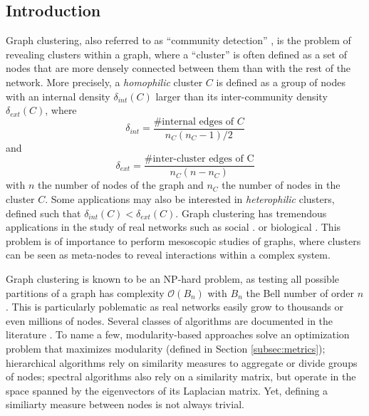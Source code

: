 \documentclass[switch, 12pt]{article}
\renewcommand{\O}{\mathcal{O}}
\begin{document}
\begin{multicols}{2}

    \section{Introduction}

    Graph clustering, also referred to as ``community detection'' \cite{fortunato_community_2010}, is the problem of revealing clusters within a graph, where a ``cluster'' is often defined as a set of nodes that are more densely connected between them than with the rest of the network.
    More precisely, a \emph{homophilic} cluster $C$ is defined as a group of nodes with an internal density $\delta_{int}(C)$ larger than its inter-community density $\delta_{ext}(C)$, where
    \begin{equation}
        \delta_{int} = \frac{\text{\# internal edges of }C}{n_C (n_C - 1) / 2}
    \end{equation}
    and
    \begin{equation}
        \delta_{ext} = \frac{\text{\# inter-cluster edges of C}}{n_C (n - n_C)}
    \end{equation}
    with $n$ the number of nodes of the graph and $n_C$ the number of nodes in the cluster $C$.
    Some applications may also be interested in \emph{heterophilic} clusters, defined such that $\delta_{int}(C) < \delta_{ext}(C)$.
    Graph clustering has tremendous applications in the study of real networks such as
    social \cite{chunaev_community_2020}. or biological \cite{sah_exploring_2014}. This problem is of importance to perform mesoscopic studies of graphs, where clusters can be seen as meta-nodes to reveal interactions within a complex system.


    Graph clustering is known to be an NP-hard problem, as testing all possible partitions of a graph has complexity $\O(B_n)$ with $B_n$ the Bell number of order $n$. This is particularly poblematic as real networks easily grow to thousands or even millions of nodes. Several classes of algorithms are documented in the literature \cite{fortunato_community_2010}. To name a few, modularity-based approaches solve an optimization problem that maximizes modularity (defined in Section \ref{subsec:metrics}); hierarchical algorithms rely on similarity measures to aggregate or divide groups of nodes; spectral algorithms also rely on a similarity matrix, but operate in the space spanned by the eigenvectors of its Laplacian matrix. Yet, defining a similiarty measure between nodes is not always trivial.


\end{multicols}
\end{document}
